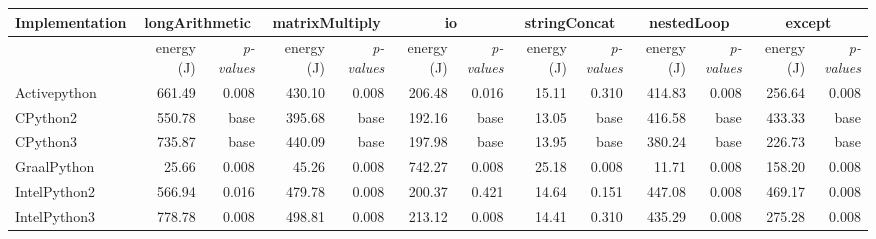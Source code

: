 \begin{table*}[htbp]
{\begin{tabular}{l|rr|rr|rr|rr|rr|rr}
            Implementation & \multicolumn{2}{c}{longArithmetic} & \multicolumn{2}{c}{matrixMultiply} & \multicolumn{2}{c}{io} & \multicolumn{2}{c}{stringConcat} & \multicolumn{2}{c}{nestedLoop} & \multicolumn{2}{c}{except}                                                                                         \\
            \midrule
                           & energy (J)                         & \em p-values                       & energy (J)             & \em p-values                     & energy (J)                     & \em p-values               & energy (J)  & \em p-values & energy (J)  & \em p-values & energy (J)   & \em p-values \\
            Activepython   & 661.49                             & 0.008                              & 430.10                 & 0.008                            & 206.48                         & 0.016                      & 15.11       & 0.310        & 414.83      & 0.008        & 256.64       & 0.008        \\
            CPython2       & 550.78                             & base                               & 395.68                 & base                             & 192.16                         & base                       & 13.05       & base         & 416.58      & base         & 433.33       & base         \\
            CPython3       & 735.87                             & base                               & 440.09                 & base                             & 197.98                         & base                       & 13.95       & base         & 380.24      & base         & 226.73       & base         \\
            GraalPython    & 25.66                              & 0.008                              & 45.26                  & 0.008                            & 742.27                         & 0.008                      & 25.18       & 0.008        & 11.71       & 0.008        & 158.20       & 0.008        \\
            IntelPython2   & 566.94                             & 0.016                              & 479.78                 & 0.008                            & 200.37                         & 0.421                      & 14.64       & 0.151        & 447.08      & 0.008        & 469.17       & 0.008        \\
            IntelPython3   & 778.78                             & 0.008                              & 498.81                 & 0.008                            & 213.12                         & 0.008                      & 14.41       & 0.310        & 435.29      & 0.008        & 275.28       & 0.008        \\

\end{tabular}}
\end{table*}
